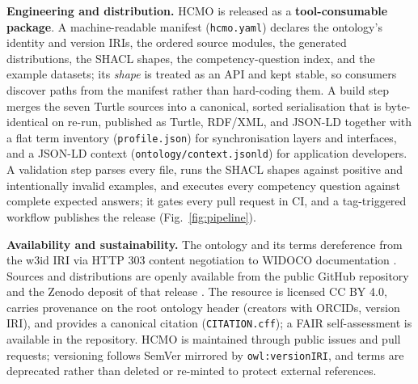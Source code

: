 \textbf{Engineering and distribution.} HCMO is released as a \textbf{tool-consumable package}. A machine-readable manifest (\nolinkurl{hcmo.yaml}) declares the ontology's identity and version IRIs, the ordered source modules, the generated distributions, the SHACL shapes, the competency-question index, and the example datasets; its \emph{shape} is treated as an API and kept stable, so consumers discover paths from the manifest rather than hard-coding them. A build step merges the seven Turtle sources into a canonical, sorted serialisation that is byte-identical on re-run, published as Turtle, RDF/XML, and JSON-LD together with a flat term inventory (\nolinkurl{profile.json}) for synchronisation layers and interfaces, and a JSON-LD context (\nolinkurl{ontology/context.jsonld}) for application developers. A validation step parses every file, runs the SHACL shapes against positive and intentionally invalid examples, and executes every competency question against complete expected answers; it gates every pull request in CI, and a tag-triggered workflow publishes the release (Fig.~\ref{fig:pipeline}).



\textbf{Availability and sustainability.} The ontology and its terms dereference from the w3id IRI via HTTP 303 content negotiation to WIDOCO documentation \cite{widoco2017}. Sources and distributions are openly available from the public GitHub repository and the Zenodo deposit of that release .  The resource is licensed CC BY 4.0, carries provenance on the root ontology header (creators with ORCIDs, version IRI), and provides a canonical citation (\nolinkurl{CITATION.cff}); a FAIR self-assessment is available in the repository. HCMO is maintained through public issues and pull requests; versioning follows SemVer mirrored by \nolinkurl{owl:versionIRI}, and terms are deprecated rather than deleted or re-minted to protect external references. 
